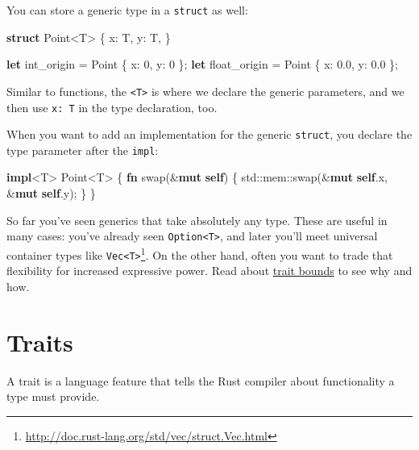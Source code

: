 \documentclass[a4paper,]{book}
\newenvironment{Shaded}{\begin{snugshade}}{\end{snugshade}}
\newcommand{\KeywordTok}[1]{\textcolor[rgb]{0.13,0.29,0.53}{\textbf{{#1}}}}
\newcommand{\DecValTok}[1]{\textcolor[rgb]{0.00,0.00,0.81}{{#1}}}
\newcommand{\NormalTok}[1]{{#1}}
\renewcommand{\href}[2]{#2\footnote{\url{#1}}}
\begin{document}
You can store a generic type in a \texttt{struct} as well:

\begin{Shaded}
\begin{Highlighting}[]
\KeywordTok{struct} \NormalTok{Point<T> \{}
    \NormalTok{x: T,}
    \NormalTok{y: T,}
\NormalTok{\}}

\KeywordTok{let} \NormalTok{int_origin = Point \{ x: }\DecValTok{0}\NormalTok{, y: }\DecValTok{0} \NormalTok{\};}
\KeywordTok{let} \NormalTok{float_origin = Point \{ x: }\DecValTok{0.0}\NormalTok{, y: }\DecValTok{0.0} \NormalTok{\};}
\end{Highlighting}
\end{Shaded}

Similar to functions, the \texttt{\textless{}T\textgreater{}} is where
we declare the generic parameters, and we then use \texttt{x:\ T} in the
type declaration, too.

When you want to add an implementation for the generic \texttt{struct},
you declare the type parameter after the \texttt{impl}:

\begin{Shaded}
\begin{Highlighting}[]
\KeywordTok{impl}\NormalTok{<T> Point<T> \{}
    \KeywordTok{fn} \NormalTok{swap(&}\KeywordTok{mut} \KeywordTok{self}\NormalTok{) \{}
        \NormalTok{std::mem::swap(&}\KeywordTok{mut} \KeywordTok{self}\NormalTok{.x, &}\KeywordTok{mut} \KeywordTok{self}\NormalTok{.y);}
    \NormalTok{\}}
\NormalTok{\}}
\end{Highlighting}
\end{Shaded}

So far you've seen generics that take absolutely any type. These are
useful in many cases: you've already seen
\texttt{Option\textless{}T\textgreater{}}, and later you'll meet
universal container types like
\href{http://doc.rust-lang.org/std/vec/struct.Vec.html}{\texttt{Vec\textless{}T\textgreater{}}}.
On the other hand, often you want to trade that flexibility for
increased expressive power. Read about
\protect\hyperlink{sec--traits}{trait bounds} to see why and how.

\hypertarget{sec--traits}{\section{Traits}\label{sec--traits}}

A trait is a language feature that tells the Rust compiler about
functionality a type must provide.
\end{document}
